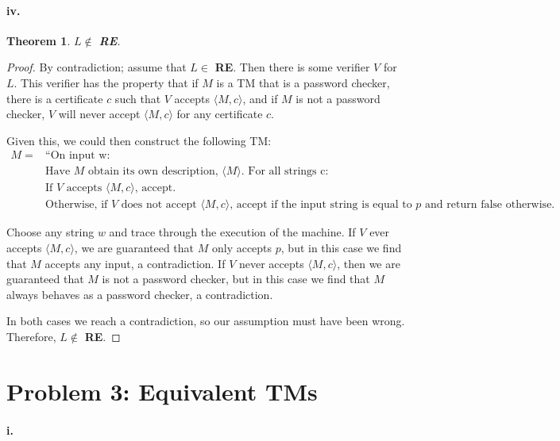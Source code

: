 \documentclass[10pt,letter]{article}
\newtheorem*{thm}{Theorem}
\begin{document}
\paragraph{iv.} \begin{thm} $L \not \in $ \textbf{RE}. \end{thm}
\begin{proof} 

By contradiction; assume that $L \in$ \textbf{RE}. Then there is some verifier $V$ for $L$. This verifier has the property that if $M$ is a TM that is a password checker, there is a certificate $c$ such that $V$ accepts $\langle M, c \rangle$, and if $M$ is not a password checker, $V$ will never accept $\langle M, c \rangle$ for any certificate $c$.

Given this, we could then construct the following TM:
\begin{align*}
M = &\text{“On input w:}\\
&\text{Have $M$ obtain its own description, $\langle M \rangle$. For all strings c:}\\
&\text{If $V$ accepts $\langle M, c \rangle$, accept.}\\
&\text{Otherwise, if $V$ does not accept $\langle M, c \rangle$, accept if the input string is equal to $p$ and return false otherwise.}
\end{align*}

Choose any string $w$ and trace through the execution of the machine. If $V$ ever accepts $\langle M, c \rangle$, we are guaranteed that $M$ only accepts $p$, but in this case we find that $M$ accepts any input, a contradiction. If $V$ never accepts $\langle M, c \rangle$, then we are guaranteed that $M$ is not a password checker, but in this case we find that $M$ always behaves as a password checker, a contradiction.

In both cases we reach a contradiction, so our assumption must have been wrong. Therefore, $L \not \in$ \textbf{RE}.
\end{proof}

\section*{Problem 3: Equivalent TMs}

\paragraph{i.} 

\end{document}
